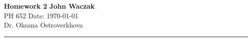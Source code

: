 \documentclass[a4paper, 11pt]{article}
\begin{document}
\noindent
\large\textbf{Homework 2} \hfill \textbf{John Waczak} \\
\normalsize PH 652 \hfill  Date: \today \\
Dr. Oksana Ostroverkhova  
\par\noindent\rule{\textwidth}{0.4pt} \\\\
\end{document}
